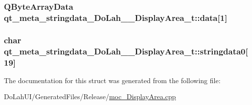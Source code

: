 \subsubsection[{data}]{\setlength{\rightskip}{0pt plus 5cm}Q\+Byte\+Array\+Data qt\+\_\+meta\+\_\+stringdata\+\_\+\+Do\+Lah\+\_\+\+\_\+\+Display\+Area\+\_\+t\+::data\mbox{[}1\mbox{]}}\label{structqt__meta__stringdata___do_lah_____display_area__t_a721555be9761a34f6cdfb7cc0f5091f8}
\hypertarget{structqt__meta__stringdata___do_lah_____display_area__t_af97b5f16cd66184e2d951a650e708baa}{}
\subsubsection[{stringdata0}]{\setlength{\rightskip}{0pt plus 5cm}char qt\+\_\+meta\+\_\+stringdata\+\_\+\+Do\+Lah\+\_\+\+\_\+\+Display\+Area\+\_\+t\+::stringdata0\mbox{[}19\mbox{]}}\label{structqt__meta__stringdata___do_lah_____display_area__t_af97b5f16cd66184e2d951a650e708baa}


The documentation for this struct was generated from the following file\+:\begin{DoxyCompactItemize}
\item 
Do\+Lah\+U\+I/\+Generated\+Files/\+Release/\hyperlink{moc___display_area_8cpp}{moc\+\_\+\+Display\+Area.\+cpp}\end{DoxyCompactItemize}
